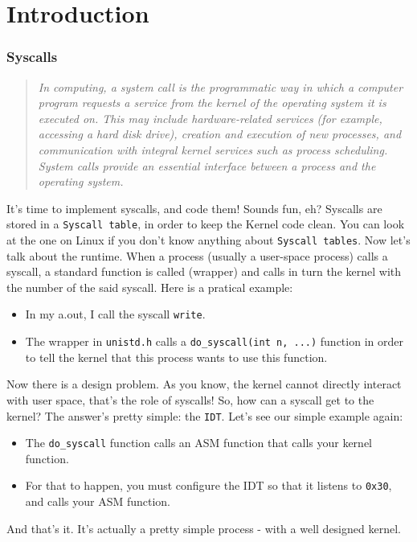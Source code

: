 \documentclass{42-en}
\begin{document}
\chapter{Introduction}
    \subsection{Syscalls}
        \begin{quotation}
            \textit{In computing, a system call is the programmatic way in
            which a computer program requests a service from the kernel of the
            operating system it is executed on. This may include
            hardware-related services (for example, accessing a hard disk
            drive), creation and execution of new processes, and communication
            with integral kernel services such as process scheduling. System
            calls provide an essential interface between a process and the
            operating system.}
        \end{quotation}
        It's time to implement syscalls, and code them! Sounds fun, eh?
        Syscalls are stored in a \texttt{Syscall table}, in order to keep the
        Kernel code clean. You can look at the one on Linux if you don't know
        anything about \texttt{Syscall tables}. Now let's talk about the
        runtime. When a process (usually a user-space process) calls a syscall,
        a standard function is called (wrapper) and calls in turn the kernel
        with the number of the said syscall. Here is a pratical example:\\
        \begin{itemize}\itemsep1pt
            \item In my a.out, I call the syscall \texttt{write}.
            \item The wrapper in \texttt{unistd.h} calls a
            \texttt{do\_syscall(int n, ...)} function in order to tell the
            kernel that this process wants to use this function.
        \end{itemize}
        Now there is a design problem. As you know, the kernel cannot
        directly interact with user space, that's the role of syscalls!
        So, how can a syscall get to the kernel? The answer's pretty simple:
        the \texttt{IDT}. Let's see our simple example again:
        \begin{itemize}\itemsep1pt
            \item The \texttt{do\_syscall} function calls an ASM function that
            calls your kernel function.
            \item For that to happen, you must configure the IDT so that it
            listens to \texttt{0x30}, and calls your ASM function.
        \end{itemize}
        And that's it. It's actually a pretty simple process - with a well
        designed kernel.
\newpage
\end{document}
